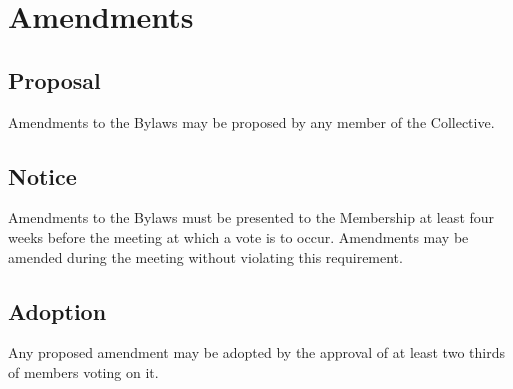 \chapter{Amendments}

\section{Proposal}\label{sec:proposal}
Amendments to the Bylaws may be proposed by any member of the Collective.

\section{Notice}\label{sec:notice}
Amendments to the Bylaws must be presented to the Membership at least four weeks before the meeting at which a vote is to occur. Amendments may be amended during the meeting without violating this requirement.

\section{Adoption}\label{sec:adoption}
Any proposed amendment may be adopted by the approval of at least two thirds of members voting on it.
